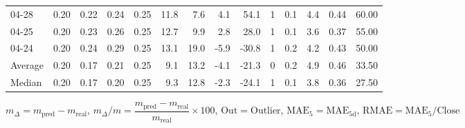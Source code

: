 \begin{threeparttable}
{\begin{tabular}{lrrrrrrrrrrrrr}
  04-28 &          0.20 &          0.22 &          0.24 &        0.25 &                11.8 &                 7.6 &        4.1 &         54.1 &              1 &                 0.1 &              4.4 &            0.44 &                  60.00 \\
  04-25 &          0.20 &          0.23 &          0.26 &        0.25 &                12.7 &                 9.9 &        2.8 &         28.0 &              1 &                 0.1 &              3.6 &            0.37 &                  55.00 \\
  04-24 &          0.20 &          0.24 &          0.29 &        0.25 &                13.1 &                19.0 &       -5.9 &        -30.8 &              1 &                 0.2 &              4.2 &            0.43 &                  50.00 \\
Average &          0.20 &          0.17 &          0.21 &        0.25 &                 9.1 &                13.2 &       -4.1 &        -21.3 &              0 &                 0.2 &              4.9 &            0.46 &                  33.50 \\
 Median &          0.20 &          0.17 &          0.20 &        0.25 &                 9.3 &                12.8 &       -2.3 &        -24.1 &              1 &                 0.1 &              3.8 &            0.36 &                  27.50 \\
\bottomrule
\end{tabular}
}
\begin{tablenotes}\footnotesize
\item $m_\Delta=m_{\text{pred}}-m_{\text{real}}$,
$m_\Delta/m=\dfrac{m_{\text{pred}}-m_{\text{real}}}{m_{\text{real}}}\times100$,
$\mathrm{Out}=\text{Outlier}$,
$\mathrm{MAE}_5=\mathrm{MAE}_{5\text{d}}$,
$\mathrm{RMAE}=\mathrm{MAE}_5/\text{Close}$
\end{tablenotes}
\end{threeparttable}
\endgroup

